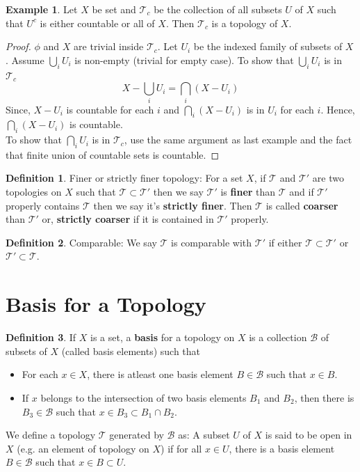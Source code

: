 \documentclass[12pt,reqno]{amsart}
\theoremstyle{plain}
\theoremstyle{definition}
\newtheorem{defn}{Definition}
\newtheorem{eg}{Example}
\begin{document}
\begin{eg}
    Let $X$ be set and $\mathcal{T}_c$ be the collection of all subsets $U$ of $X$ such that $U^c$ is either countable or all of $X$. Then $\mathcal{T}_c$ is a topology of $X$. 
\end{eg}
\begin{proof}
    $\phi$ and $X$ are trivial inside $\mathcal{T}_c$. Let $U_i$ be the indexed family of subsets of $X$. Assume $\bigcup\limits_i U_i$ is non-empty (trivial for empty case). To show that $\bigcup\limits_i U_i$ is in $\mathcal{T}_c$
    $$ X - \bigcup\limits_i U_i = \bigcap\limits_i (X - U_i)$$
    Since, $X - U_i$ is countable for each $i$ and $\bigcap\limits_i (X - U_i)$ is in $U_i$ for each $i$. Hence, $\bigcap\limits_i (X - U_i)$ is countable. \\
    To show that $\bigcap\limits_i U_i$ is in $\mathcal{T}_c$, use the same argument as last example and the fact that finite union of countable sets is countable.
\end{proof}
\begin{defn}
    Finer or strictly finer topology: For a set $X$, if $\mathcal{T}$ and $\mathcal{T}'$ are two topologies on $X$ such that $\mathcal{T} \subset \mathcal{T}'$ then we say $\mathcal{T}'$ is {\bf finer} than $\mathcal{T}$ and if $\mathcal{T}'$ properly contains $\mathcal{T}$ then we say it's {\bf strictly finer}. Then $\mathcal{T}$ is called {\bf coarser} than $\mathcal{T}'$ or, {\bf strictly coarser} if it is contained in $\mathcal{T}'$ properly.
\end{defn}
\begin{defn}
    Comparable: We say $\mathcal{T}$ is comparable with $\mathcal{T}'$ if either $\mathcal{T} \subset \mathcal{T}'$ or $\mathcal{T}' \subset \mathcal{T}$.
\end{defn}
\section{Basis for a Topology}
\begin{defn}
    If $X$ is a set, a {\bf basis} for a topology on $X$ is a collection $\mathcal{B}$ of subsets of $X$ (called basis elements) such that
    \begin{itemize}
        \item For each $x \in X$, there is atleast one basis element $B \in \mathcal{B}$ such that $x \in B$.
        \item If $x$ belongs to the intersection of two basis elements $B_1$ and $B_2$, then there is $B_3 \in \mathcal{B}$ such that $x \in B_3 \subset B_1 \cap B_2$. 
    \end{itemize}
\end{defn}
We define a topology $\mathcal{T}$ generated by $\mathcal{B}$ as: A subset $U$ of $X$ is said to be open in $X$ (e.g. an element of topology on $X$) if for all $x \in U$, there is a basis element $B \in \mathcal{B}$ such that $x \in B \subset U$.
\end{document}
